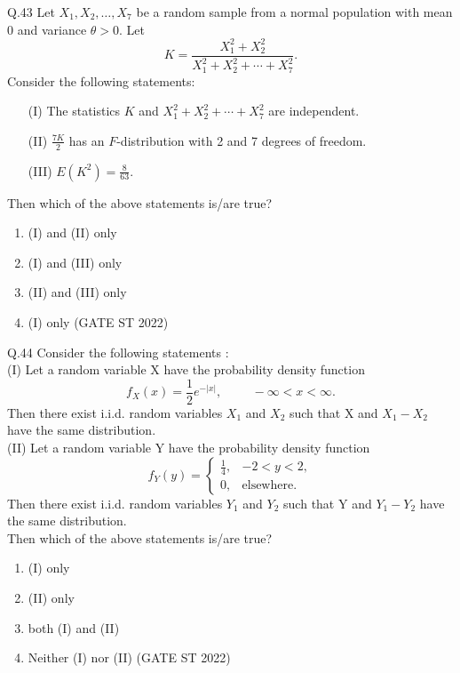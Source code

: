\documentclass[journal,12pt,onecolumn]{IEEEtran}
\theoremstyle{remark}
\begin{document}
	\vspace{2em}
Q.43 Let \(X_1, X_2, \ldots, X_7\) be a random sample from a normal population with mean 0 and variance \(\theta > 0\). Let
\[
K = \frac{X_1^2 + X_2^2}{X_1^2 + X_2^2 + \cdots + X_7^2}.
\]
Consider the following statements:
\begin{enumerate}[label=\Alph*.] 
	\item[(I)] The statistics \(K\) and \(X_1^2 + X_2^2 + \cdots + X_7^2\) are independent.
	\item[(II)] \(\frac{7K}{2}\) has an \(F\)-distribution with 2 and 7 degrees of freedom.
	\item[(III)] \(E(K^2) = \frac{8}{63}.\)
\end{enumerate}
Then which of the above statements is/are true?
\begin{enumerate}[label=\Alph*.] 
	\item (I) and (II) only
	\item (I) and (III) only
	\item (II) and (III) only
	\item (I) only
	\hfill (GATE ST 2022)
\end{enumerate}
	\vspace{2em}
Q.44 Consider the following statements :\\
(I) Let a random variable X have the probability density function 
\[
f_X(x) = \frac{1}{2}e^{-|x|}, \hspace{1cm} -\infty < x < \infty.
\]
Then there exist i.i.d. random variables $X_1$ and $X_2$ such that X and $X_1 - X_2$ have the same distribution. \\
(II) Let a random variable Y have the probability density function 
\[
f_Y(y) = \begin{cases}
	\frac{1}{4}, & -2 < y < 2,\\
	0, & \text{elsewhere}.
\end{cases}
\]
Then there exist i.i.d. random variables $Y_1$ and $Y_2$ such that Y and $Y_1 - Y_2$ have the same distribution.\\
Then which of the above statements is/are true?
\begin{enumerate}[label=\Alph*.] 
	\item (I) only
	\item (II) only
	\item both (I) and (II)
	\item Neither (I) nor (II)
	\hfill (GATE ST 2022)
\end{enumerate}
	\vspace{2em}
\end{document}
